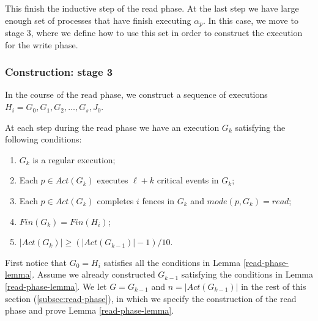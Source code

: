 This finish the inductive step of the read phase. At the last step we have large enough set of processes that have finish executing $\alpha_p$. In this case, we move to stage 3, where we define how to use this set in order to construct the execution for the write phase.



\subsubsection{Construction: stage 3}


















\newpage
In the course of the read phase, we construct a sequence of executions $H_i=G_0,G_1,G_2,\ldots,G_s, J_0$.

\begin{lemma} \label{read-phase-lemma}
	At each step during the read phase we have an execution $G_k$ satisfying the following conditions:
	\begin{enumerate}[(1)]
		\item $G_k$ is a regular execution;
		\item Each $p \in Act(G_k)$ executes $\ell+k$ critical events in $G_k$;
		\item Each $p \in Act(G_k)$ completes $i$ fences in $G_k$ and $mode(p,G_k) = read$;
		\item $Fin(G_k) = Fin(H_i)$;
		\item $|Act(G_k)| \geq (|Act(G_{k-1})|-1)/10$.
	\end{enumerate}
\end{lemma}

\vspace{3mm} First notice that $G_0 = H_i$ satisfies all the conditions in Lemma \ref{read-phase-lemma}. Assume we already constructed $G_{k-1}$ satisfying the conditions in Lemma \ref{read-phase-lemma}. We let $G=G_{k-1}$ and $n=|Act(G_{k-1})|$ in the rest of this section (\ref{subsec:read-phase}), in which we specify the construction of the read phase and prove Lemma \ref{read-phase-lemma}.

